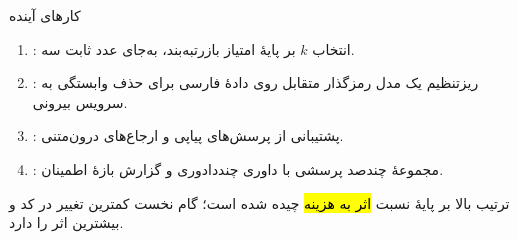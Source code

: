 \begin{frame}{کارهای آینده}
  \begin{enumerate}
    \item {}: انتخاب \(k\) بر پایهٔ امتیاز بازرتبه‌بند، به‌جای
          عدد ثابت سه.
    \item {}: ریزتنظیم یک مدل رمزگذار متقابل روی دادهٔ فارسی
          برای حذف وابستگی به سرویس بیرونی.
    \item {}: پشتیبانی از پرسش‌های پیاپی و ارجاع‌های درون‌متنی.
    \item {}: مجموعهٔ چند‌صد پرسشی با داوری چنددادوری و
          گزارش بازهٔ اطمینان.
  \end{enumerate}

  \begin{PTnote}
    ترتیب بالا بر پایهٔ نسبت \hl{اثر به هزینه} چیده شده است؛ گام نخست کمترین
    تغییر در کد و بیشترین اثر را دارد.
  \end{PTnote}
\end{frame}
